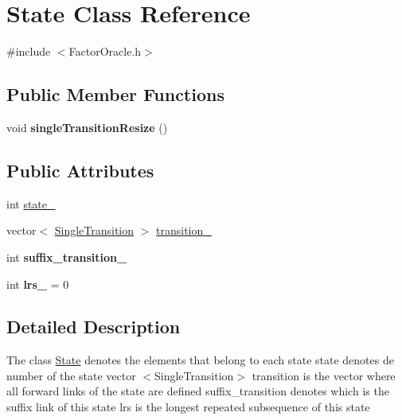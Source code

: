 \hypertarget{class_state}{}\section{State Class Reference}
\label{class_state}


{\ttfamily \#include $<$Factor\+Oracle.\+h$>$}

\subsection*{Public Member Functions}
\begin{DoxyCompactItemize}
\item 
\mbox{\label{class_state_a472cf58ec39b9f2158560f8aae3b89c8}} 
void {\bfseries single\+Transition\+Resize} ()
\end{DoxyCompactItemize}
\subsection*{Public Attributes}
\begin{DoxyCompactItemize}
\item 
int \mbox{\hyperlink{class_state_a2dcf672a1560830a8f93b0e9863c6724}{state\+\_\+}}
\item 
vector$<$ \mbox{\hyperlink{class_single_transition}{Single\+Transition}} $>$ \mbox{\hyperlink{class_state_afd5b3d2afbba2fc03583f76a7cb08fe8}{transition\+\_\+}}
\item 
\mbox{\label{class_state_ae1daff1d8cfaf403f5f81b74a32d18cf}} 
int {\bfseries suffix\+\_\+transition\+\_\+}
\item 
\mbox{\label{class_state_a232fd4e8e92e228c5ad8542c8d45e9b6}} 
int {\bfseries lrs\+\_\+} = 0
\end{DoxyCompactItemize}


\subsection{Detailed Description}
The class \mbox{\hyperlink{class_state}{State}} denotes the elements that belong to each state state denotes de number of the state vector $<$\+Single\+Transition$>$ transition is the vector where all forward links of the state are defined suffix\+\_\+transition denotes which is the suffix link of this state lrs is the longest repeated subsequence of this state 

